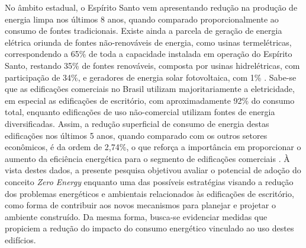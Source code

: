 \begin{onehalfspace}
No âmbito estadual, o Espírito Santo vem apresentando redução na produção de energia limpa nos últimos 8 anos, quando comparado proporcionalmente ao consumo de fontes tradicionais. Existe ainda a parcela de geração de energia elétrica oriunda de fontes não-renováveis de energia, como usinas termelétricas, correspondendo a 65\% de toda a capacidade instalada em operação do  Espírito  Santo,  restando  35\%  de  fontes  renováveis,  composta  por  usinas  hidrelétricas,  com participação  de  34\%,  e  geradores  de  energia  solar  fotovoltaica,  com  1\% \cite{AgenciadeRegulacaodeServicosPublicosdoEspiritoSanto-ARSP2019,EnergiasdePortugal-EDP2017}.\vspace*{0.3cm} \newline
Sabe-se  que  as  edificações  comerciais no  Brasil  utilizam  majoritariamente  a  eletricidade, em especial  as  edificações  de escritório,  com  aproximadamente  92\%  do  consumo  total,  enquanto edificações  de  uso  não-comercial  utilizam  fontes  de  energia  diversificadas.  Assim,  a  redução superficial de consumo de energia destas edificações nos últimos 5 anos, quando comparado com os  outros  setores  econômicos,  é  da  ordem  de  2,74\%,  o  que  reforça  a  importância  em proporcionar  o  aumento  da  eficiência  energética  para  o  segmento  de  edificações  comerciais \cite{AgenciadeRegulacaodeServicosPublicosdoEspiritoSanto-ARSP2018, AgenciadeRegulacaodeServicosPublicosdoEspiritoSanto-ARSP2019, EmpresadePesquisaEnergetica-EPE2018}.\vspace*{0.3cm} \newline
À vista  destes dados,  a presente pesquisa objetivou avaliar  o  potencial de adoção  do  conceito \textit{Zero Energy}   enquanto   uma  das  possíveis   estratégias  visando   a   redução   dos  problemas energéticos e ambientais relacionados às edificações de escritório, como forma de contribuir aos novos mecanismos para planejar e projetar o ambiente construído. Da mesma forma, busca-se evidenciar  medidas que propiciem  a  redução  do impacto  do  consumo  energético  vinculado  ao uso destes edifícios.
\end{onehalfspace}
